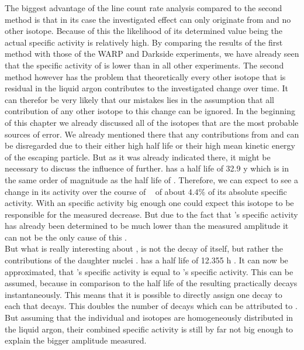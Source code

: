\documentclass[encoding=utf8,british]{tumphthesis}
\begin{document}
The biggest advantage of the line count rate analysis compared to the second method is that in its case the investigated effect can only originate from \Kr and no other isotope.
Because of this the likelihood of its determined value being the actual specific activity is relatively high.
By comparing the results of the first method with those of the WARP and Darkside experiments, we have already seen that the specific activity of \Kr is lower than in all other experiments.
The second method however has the problem that theoretically every other isotope that is residual in the liquid argon contributes to the investigated change over time.
It can therefor be very likely that our mistakes lies in the assumption that all contribution of any other isotope to this change can be ignored. 
In the beginning of this chapter we already discussed all of the isotopes that are the most probable sources of error.
We already mentioned there that any contributions from  and  can be disregarded due to their either high half life or their high mean kinetic energy of the escaping particle.
But as it was already indicated there, it might be necessary to discuss the influence of  further.
 has a half life of 32.9 y which is in the same order of magnitude as the half life of \Kr.
Therefore, we can expect to see a change in its activity over the course of \PII~ of about 4.4$\%$ of its absolute specific activity.
With an specific activity big enough one could expect this isotope to be responsible for the measured decrease.
But due to the fact that 's specific activity has already been determined to be much lower than the measured amplitude it can not be the only cause of this .
\\

But what is really interesting about , is not the decay of  itself, but rather the contributions of the daughter nuclei .
 has a half life of 12.355 h \cite{chen_nuclear_2016}.
It can now be approximated, that 's specific activity is equal to 's specific activity.
This can be assumed, because in comparison to the half life of  the resulting  practically decays instantaneously.
This means that it is possible to directly assign one  decay to each  that decays.
This doubles the number of decays which can be attributed to .
But assuming that the individual  and  isotopes are homogeneously distributed in the liquid argon, their combined specific activity is still by far not big enough to explain the bigger amplitude measured.
\\
\end{document}
